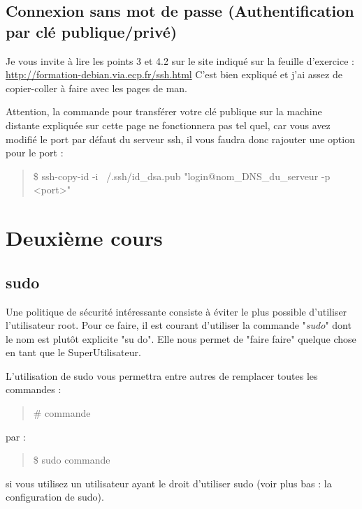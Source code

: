 \documentclass[a4paper,11pt]{article}
\newcommand{\commande}[1] {
    \begin{quote}
    \tt\raggedright #1
    \end{quote}
}
\begin{document}
\subsection{Connexion sans mot de passe (Authentification par clé publique/privé)}
\par Je vous invite à lire les points 3 et 4.2 sur le site indiqué sur la feuille d'exercice : \\
\url{http://formation-debian.via.ecp.fr/ssh.html} C'est bien expliqué et j'ai assez de copier-coller à faire avec les pages de man.
\par Attention, la commande pour transférer votre clé publique sur la machine distante expliquée sur cette page ne fonctionnera pas tel quel, car vous avez modifié le port par défaut du serveur ssh, il vous faudra donc rajouter une option pour le port :
\commande{\$ ssh-copy-id -i ~/.ssh/id\_dsa.pub "login@nom\_DNS\_du\_serveur -p <port>"}

\section{Deuxième cours}
\subsection{sudo}
\par Une politique de sécurité intéressante consiste à éviter le plus possible d'utiliser l'utilisateur root. Pour ce faire, il est courant d'utiliser la commande "\emph{sudo}" dont le nom est plutôt explicite "su do". Elle nous permet de "faire faire" quelque chose en tant que le SuperUtilisateur.
\par L'utilisation de sudo vous permettra entre autres de remplacer toutes les commandes :
\commande{\# commande}
par :
\commande{\$ sudo commande}
si vous utilisez un utilisateur ayant le droit d'utiliser sudo (voir plus bas : la configuration de sudo).
\end{document}
